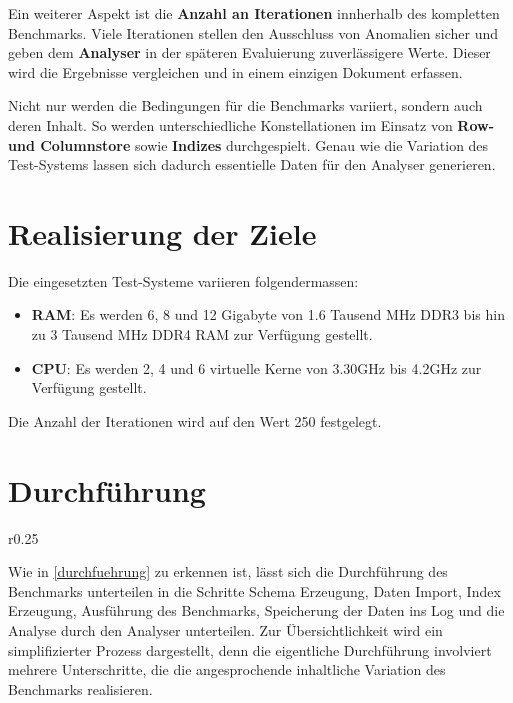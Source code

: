 Ein weiterer Aspekt ist die \textbf{Anzahl an Iterationen} innherhalb des kompletten Benchmarks. Viele Iterationen stellen den Ausschluss von Anomalien sicher und geben dem \textbf{Analyser} in der späteren Evaluierung zuverlässigere Werte. Dieser wird die Ergebnisse vergleichen und in einem einzigen Dokument erfassen. 

Nicht nur werden die Bedingungen für die Benchmarks variiert, sondern auch deren Inhalt. So werden unterschiedliche Konstellationen im Einsatz von \textbf{Row- und Columnstore} sowie \textbf{Indizes} durchgespielt. Genau wie die Variation des Test-Systems lassen sich dadurch essentielle Daten für den Analyser generieren. 

\section{Realisierung der Ziele}

Die eingesetzten Test-Systeme variieren folgendermassen: 
\begin{itemize}
	\item \textbf{RAM}: Es werden 6, 8 und 12 Gigabyte von 1.6 Tausend MHz DDR3 bis hin zu 3 Tausend MHz DDR4 RAM zur Verfügung gestellt. 
	\item \textbf{CPU}: Es werden 2, 4 und 6 virtuelle Kerne von 3.30GHz bis 4.2GHz zur Verfügung gestellt. 
\end{itemize}

Die Anzahl der Iterationen wird auf den Wert 250 festgelegt.

\newpage

\section{Durchführung}

\begin{wrapfigure}{r}{0.25\textwidth} 
\end{wrapfigure}

Wie in \autoref{durchfuehrung} zu erkennen ist, lässt sich die Durchführung des Benchmarks unterteilen in die Schritte Schema Erzeugung, Daten Import, Index Erzeugung, Ausführung des Benchmarks, Speicherung der Daten ins Log und die Analyse durch den Analyser unterteilen. Zur Übersichtlichkeit wird ein simplifizierter Prozess dargestellt, denn die eigentliche Durchführung involviert mehrere Unterschritte, die die angesprochende inhaltliche Variation des Benchmarks realisieren. 

